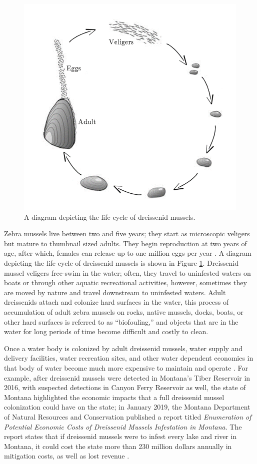 \documentclass[12pt]{article}\usepackage[]{graphicx}\usepackage[]{color}
\begin{document}
\begin{figure}[]
	\centering
	\includegraphics[scale = 0.6]{images/lifecycle}
	\caption{A diagram depicting the life cycle of dreissenid mussels.}
	\label{fig:lifecycle}
\end{figure}

Zebra mussels live between two and five years; they start as microscopic veligers but mature to thumbnail sized adults. They begin reproduction at two years of age, after which, females can release up to one million eggs per year \cite{NPS}. A diagram depicting the life cycle of dreissenid mussels is shown in Figure \ref{fig:lifecycle}. Dreissenid mussel veligers free-swim in the water; often, they travel to uninfested waters on boats or through other aquatic recreational activities, however, sometimes they are moved by nature and travel downstream to uninfested waters. Adult dreissenids attach and colonize hard surfaces in the water, this process of accumulation of adult zebra mussels on rocks, native mussels, docks, boats, or other hard surfaces is referred to as ``biofouling,'' and objects that are in the water for long periods of time become difficult and costly to clean.

Once a water body is colonized by adult dreissenid mussels, water supply and delivery facilities, water recreation sites, and other water dependent economies in that body of water become much more expensive to maintain and operate \cite{BOR}. For example, after dreissenid mussels were detected in Montana's Tiber Reservoir in 2016, with suspected detections in Canyon Ferry Reservoir as well, the state of Montana highlighted the economic impacts that a full dreissenid mussel colonization could have on the state; in January 2019, the Montana Department of Natural Resources and Conservation published a report titled \textit{Enumeration of Potential Economic Costs of Dreissenid Mussels Infestation in Montana}. The report states that if dreissenid mussels were to infest every lake and river in Montana, it could cost the state more than 230 million dollars annually in mitigation costs, as well as lost revenue \cite{MT}. 
\end{document}

